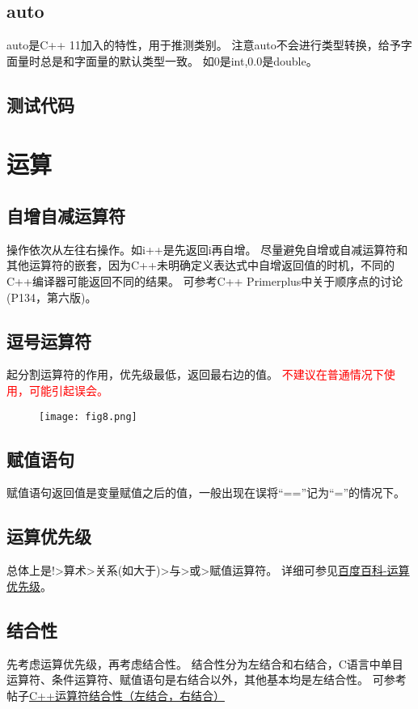 \documentclass{article}
\begin{document}
    \subsection{auto}
    auto是C++ 11加入的特性，用于推测类别。
    注意auto不会进行类型转换，给予字面量时总是和字面量的默认类型一致。
    如0是int,0.0是double。

    \subsection{测试代码}
    

    \section{运算}  
    \subsection{自增自减运算符}
    操作依次从左往右操作。如i++是先返回i再自增。
    尽量避免自增或自减运算符和其他运算符的嵌套，因为C++未明确定义表达式中自增返回值的时机，不同的C++编译器可能返回不同的结果。
    可参考C++ Primerplus中关于顺序点的讨论(P134，第六版)。
    \subsection{逗号运算符}
    起分割运算符的作用，优先级最低，返回最右边的值。
    \textcolor{red}{不建议在普通情况下使用，可能引起误会。}
    \begin{figure}[H]
        \centering
        \texttt{[image: fig8.png]}
    \end{figure}

    \subsection{赋值语句}
    赋值语句返回值是变量赋值之后的值，一般出现在误将``==''记为``=''的情况下。

    \subsection{运算优先级}
    总体上是!>算术>关系(如大于)>与>或>赋值运算符。
    详细可参见\href{https://baike.baidu.com/item/%E8%BF%90%E7%AE%97%E7%AC%A6%E4%BC%98%E5%85%88%E7%BA%A7/4752611}{百度百科-运算优先级}。

    \subsection{结合性}
    先考虑运算优先级，再考虑结合性。
    结合性分为左结合和右结合，C语言中单目运算符、条件运算符、赋值语句是右结合以外，其他基本均是左结合性。
    可参考帖子\href{https://blog.csdn.net/weixin_41565133/article/details/84332850}{C++运算符结合性（左结合，右结合）}
\end{document}

